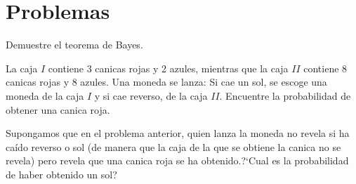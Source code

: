 \section*{Problemas}


\begin{problema}
	\label{solved:1.16}
	Demuestre el teorema de Bayes.
\end{problema}



{}
\begin{problema}
	\label{solved:1.15}
	La caja $I$ contiene 3 canicas rojas y 2 azules, mientras que la caja $II$ contiene $8$ canicas rojas y 8 azules. Una moneda se lanza: Si cae un sol, se escoge una moneda de la caja $I$ y si cae reverso, de la caja $II.$ Encuentre la probabilidad de obtener una canica roja.
\end{problema}


{}
\begin{problema}
	\label{solved:17}
	Supongamos que en el problema anterior, quien lanza la moneda no revela si ha caído reverso o sol (de manera que la caja de la que se obtiene la canica no se revela) pero revela que una canica roja se ha obtenido.?`Cual es la probabilidad de haber obtenido un sol?
\end{problema}